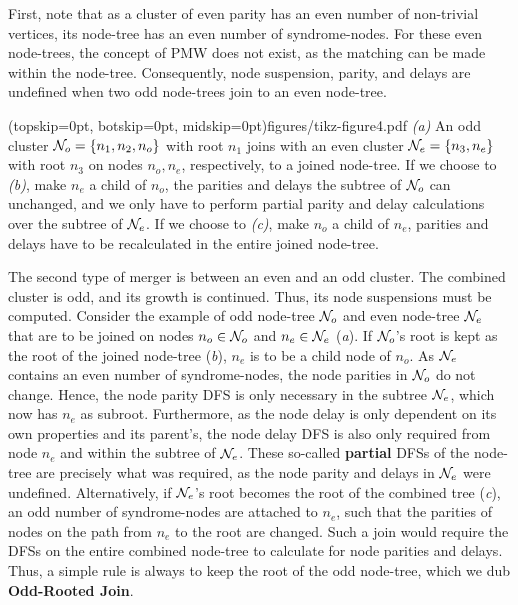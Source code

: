 First, note that as a cluster of even parity has an even number of non-trivial vertices, its node-tree has an even number of syndrome-nodes. For these even node-trees, the concept of PMW does not exist, as the matching can be made within the node-tree. Consequently, node suspension, parity, and delays are undefined when two odd node-trees join to an even node-tree. 

\Figure[hbt](topskip=0pt, botskip=0pt, midskip=0pt){figures/tikz-figure4.pdf}{
    \emph{(a)} An odd cluster $\mathcal{N}_o=\{n_1, n_2, n_o\}$ with root $n_1$ joins with an even cluster $\mathcal{N}_e=\{n_3, n_e\}$ with root $n_3$ on nodes $n_o, n_e$, respectively, to a joined node-tree. If we choose to \emph{(b)}, make $n_e$ a child of $n_o$, the parities and delays the subtree of $\mathcal{N}_o$ can unchanged, and we only have to perform partial parity and delay calculations over the subtree of $\mathcal{N}_e$. If we choose to \emph{(c)}, make $n_o$ a child of $n_e$, parities and delays have to be recalculated in the entire joined node-tree. \label{fig4}}

The second type of merger is between an even and an odd cluster. The combined cluster is odd, and its growth is continued. Thus, its node suspensions must be computed. Consider the example of odd node-tree $\mathcal{N}_o$ and even node-tree $\mathcal{N}_e$ that are to be joined on nodes $n_o\in \mathcal{N}_o$ and $n_e \in \mathcal{N}_e$ (\emph{a}). If $\mathcal{N}_o$'s root is kept as the root of the joined node-tree (\emph{b}), $n_e$ is to be a child node of $n_o$. As $\mathcal{N}_e$ contains an even number of syndrome-nodes, the node parities in $\mathcal{N}_o$ do not change. Hence, the node parity DFS is only necessary in the subtree $\mathcal{N}_e$, which now has $n_e$ as subroot. Furthermore, as the node delay is only dependent on its own properties and its parent's, the node delay DFS is also only required from node $n_e$ and within the subtree of $\mathcal{N}_e$. These so-called \textbf{partial} DFSs of the node-tree are precisely what was required, as the node parity and delays in $\mathcal{N}_e$ were undefined. Alternatively, if $\mathcal{N}_e$'s root becomes the root of the combined tree (\emph{c}), an odd number of syndrome-nodes are attached to $n_e$, such that the parities of nodes on the path from $n_e$ to the root are changed. Such a join would require the DFSs on the entire combined node-tree to calculate for node parities and delays. Thus, a simple rule is always to keep the root of the odd node-tree, which we dub \textbf{Odd-Rooted Join}.

